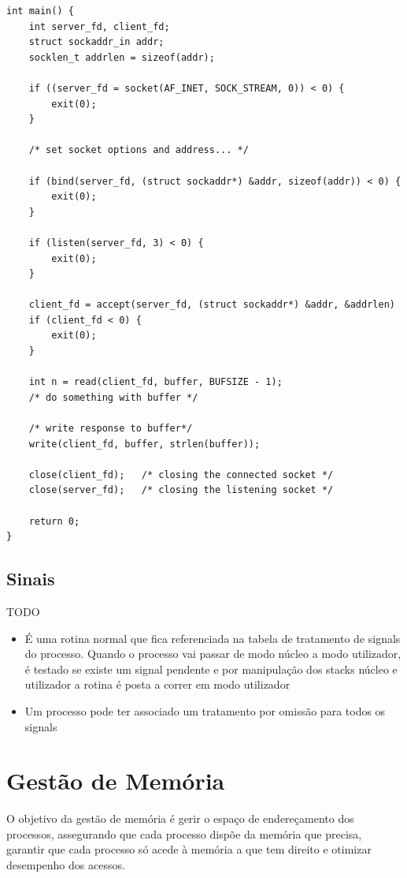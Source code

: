 \documentclass[11pt]{article}
\begin{document}
\begin{lstlisting}
int main() {
    int server_fd, client_fd;
    struct sockaddr_in addr;
    socklen_t addrlen = sizeof(addr);
    
    if ((server_fd = socket(AF_INET, SOCK_STREAM, 0)) < 0) {
        exit(0);
    }
    
    /* set socket options and address... */
    
    if (bind(server_fd, (struct sockaddr*) &addr, sizeof(addr)) < 0) {
        exit(0);
    }

    if (listen(server_fd, 3) < 0) {
        exit(0);
    }

    client_fd = accept(server_fd, (struct sockaddr*) &addr, &addrlen)
    if (client_fd < 0) {
        exit(0);
    }

    int n = read(client_fd, buffer, BUFSIZE - 1);
    /* do something with buffer */

    /* write response to buffer*/
    write(client_fd, buffer, strlen(buffer));
    
    close(client_fd);   /* closing the connected socket */
    close(server_fd);   /* closing the listening socket */

    return 0;
}
\end{lstlisting}

\subsection{Sinais}

TODO

\begin{itemize}
    \item É uma rotina normal que fica referenciada na tabela de tratamento de signals do processo. Quando o processo vai passar de modo núcleo a modo utilizador, é testado se existe um signal pendente e por manipulação dos stacks núcleo e utilizador a rotina é posta a correr em modo utilizador
    \item Um processo pode ter associado um tratamento por omissão para todos os signals
\end{itemize}

\newpage

\section{Gestão de Memória}

O objetivo da gestão de memória é gerir o espaço de endereçamento dos processos, assegurando que cada processo dispõe da memória que precisa, garantir que cada processo só acede à memória a que tem direito e otimizar desempenho dos acessos.
\end{document}
